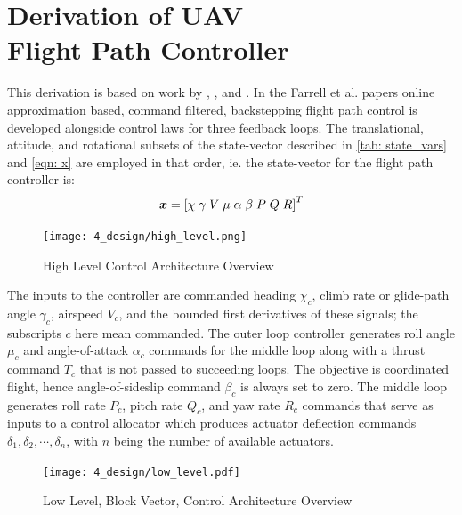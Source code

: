 \documentclass[12pt]{ucthesis}
\begin{document}
\chapter[Derivation of UAV Flight Path Controller]{Derivation of UAV \\ Flight Path Controller}
\label{chp: uav_deriv}
This derivation is based on work by \citet{Farrell2004}, \citep{Farrell2005}, \citep{Farrell2006} and \citet{Sonneveldt2007}. In the Farrell et al. papers online approximation based, command filtered, backstepping flight path control is developed alongside control laws for three feedback loops. The translational, attitude, and rotational subsets of the state-vector described in \autoref{tab: state_vars} and \autoref{eqn: x} are employed in that order, ie. the state-vector for the flight path controller is:
%
\begin{equation}
\boldsymbol{x} = \left[ \chi \; \gamma \; V \; \mu \; \alpha \; \beta \; P \; Q \; R \right]^T
\label{eq: uav_x}
\end{equation}
\begin{figure}[b]
	\centering
	\texttt{[image: 4\_design/high\_level.png]}%
	\caption{High Level Control Architecture Overview} %
	\label{fig: loop_interactions}
\end{figure}
The inputs to the controller are commanded heading $\chi_c$, climb rate or glide-path angle $\gamma_c$, airspeed $V_c$, and the bounded first derivatives of these signals; the subscripts $c$ here mean commanded. The outer loop controller generates roll angle $\mu_c$ and angle-of-attack $\alpha_c$ commands for the middle loop along with a thrust command $T_c$ that is not passed to succeeding loops. The objective is coordinated flight, hence angle-of-sideslip command $\beta_c$ is always set to zero. The middle loop generates roll rate $P_c$, pitch rate $Q_c$, and yaw rate $R_c$ commands that serve as inputs to a control allocator which produces actuator deflection commands $\delta_1,\delta_2,\cdots,\delta_n$, with $n$ being the number of available actuators.
%
\begin{figure}[t]
	\centering
	\texttt{[image: 4\_design/low\_level.pdf]}%
	\caption{Low Level, Block Vector, Control Architecture Overview \citep{Farrell2006}}
	\label{fig: loop_interactions2}
\end{figure}
\end{document}
